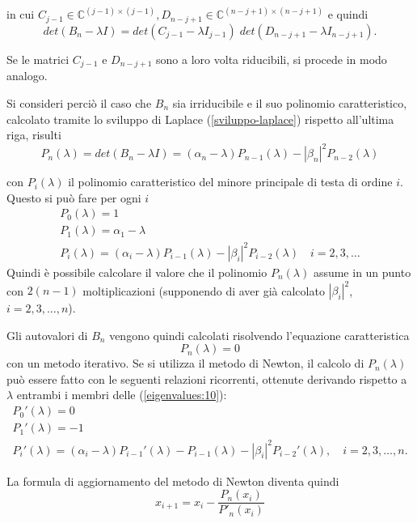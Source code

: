 in cui $C_{j−1} \in \mathbb{C}^{(j-1)\times(j-1)} , D_{n-j+1} \in
\mathbb{C}^{(n-j+1)×(n−j+1)}$ e quindi
$$ det(B_n - \lambda I) = det(C_{j-1} - \lambda I_{j-1})\;
det(D_{n-j+1} - \lambda I_{n-j+1}). $$

Se le matrici $C_{j−1}$ e $D_{n−j+1}$ sono a loro volta riducibili, si procede in modo analogo.

Si consideri perci\`o il caso che $B_n$ sia irriducibile e il suo
polinomio caratteristico, calcolato tramite lo sviluppo di Laplace
(\ref{sviluppo-laplace}) rispetto all'ultima riga, risulti
$$ P_n (\lambda) = det(B_n − \lambda I) = (\alpha_n -\lambda)
   P_{n-1}(\lambda) - |\beta_n|^2 P_{n-2} (\lambda) $$ 

con $P_i(\lambda)$ il polinomio caratteristico del minore principale
di testa di ordine $i$. Questo si può fare per ogni $i$
\begin{equation}
  \label{eigenvalues:10}
  \begin{array}{l}
    P_0(\lambda) = 1               \\
    P_1(\lambda) = \alpha_1 - \lambda \\
    P_i(\lambda) = (\alpha_i - \lambda)P_{i-1}(\lambda)
    - |\beta_i|^{2}P_{i-2}(\lambda) \quad i=2,3,\ldots
  \end{array}
\end{equation}
Quindi \`e possibile calcolare il valore che il polinomio $P_n
(\lambda)$ assume in un punto con $2(n - 1)$ moltiplicazioni
(supponendo di aver gi\`a calcolato $|\beta_i|^2$, $i = 2, 3,\ldots, n$).

Gli autovalori di $B_n$ vengono quindi calcolati risolvendo
l'equazione caratteristica
\begin{equation}
  \label{eigenvalues:11}
  P_n(\lambda) = 0
\end{equation}
con un metodo iterativo. Se si utilizza il metodo di Newton, il
calcolo di $P_n (\lambda)$ pu\`o essere fatto con le seguenti
relazioni ricorrenti, ottenute derivando rispetto a $\lambda$ entrambi
i membri delle (\ref{eigenvalues:10}):
$$
\begin{array}{l}
  P_0'(\lambda) = 0 \\
  P_1'(\lambda) = -1 \\
  P_i'(\lambda) = (\alpha_i − \lambda)P_{i-1}' (\lambda) -
  P_{i-1} (\lambda) − |\beta_i|^2 P_{i-2}'(\lambda),
  \quad i = 2, 3, \ldots, n.
\end{array}
$$

La formula di aggiornamento del metodo di Newton diventa quindi
$$ x_{i+1} = x_i - \dfrac{P_n(x_i)}{P'_n(x_i)}$$

